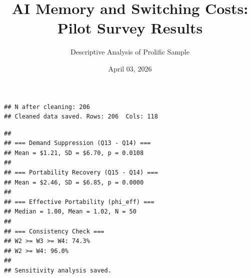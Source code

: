 \documentclass[
]{article}
\title{AI Memory and Switching Costs: Pilot Survey Results}
\subtitle{Descriptive Analysis of Prolific Sample}
\author{}
\date{\vspace{-2.5em}April 03, 2026}
\begin{document}
\maketitle

{
\setcounter{tocdepth}{2}
\tableofcontents
}
\begin{verbatim}
## N after cleaning: 206 
## Cleaned data saved. Rows: 206  Cols: 118
\end{verbatim}

\begin{verbatim}
## 
## === Demand Suppression (Q13 - Q14) ===
## Mean = $1.21, SD = $6.70, p = 0.0108
## 
## === Portability Recovery (Q15 - Q14) ===
## Mean = $2.46, SD = $6.85, p = 0.0000
## 
## === Effective Portability (phi_eff) ===
## Median = 1.00, Mean = 1.02, N = 50
## 
## === Consistency Check ===
## W2 >= W3 >= W4: 74.3%
## W2 >= W4: 96.0%
## 
## Sensitivity analysis saved.
\end{verbatim}
\end{document}
